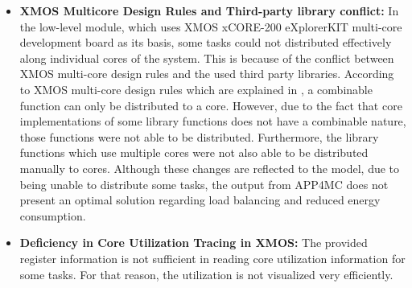\begin{itemize}
	\item \textbf{XMOS Multicore Design Rules and Third-party library conflict:} In the low-level module, which uses XMOS xCORE-200 eXplorerKIT multi-core development board as its basis, some tasks could not distributed effectively along individual cores of the system. This is because of the conflict between XMOS multi-core design rules and the used third party libraries. According to XMOS multi-core design rules which are explained in \cite{xmosprogrguide}, a combinable function can only be distributed to a core. However, due to the fact that core implementations of some library functions does not have a combinable nature, those functions were not able to be distributed. Furthermore, the library functions which use multiple cores were not also able to be distributed manually to cores. Although these changes are reflected to the model, due to being unable to distribute some tasks, the output from APP4MC does not present an optimal solution regarding load balancing and reduced energy consumption.
	\item \textbf{Deficiency in Core Utilization Tracing in XMOS:} The provided register information is not sufficient in reading core utilization information for some tasks. For that reason, the utilization is not visualized very efficiently.
\end{itemize}
